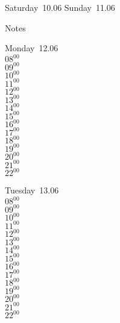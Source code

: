 \documentclass[11pt,a4paper]{book}\usepackage[]{graphicx}\usepackage[]{color}
\begin{document}
\begin{weekendbox}
  Saturday~10.06
  \tcblower
  Sunday~11.06
\end{weekendbox} %
\begin{notebox}
  Notes
\end{notebox}
\clearpage
\begin{headerbox}
\end{headerbox}
\begin{weekdaybox}
  Monday~12.06\\
  { 
  \vfill
  $08^{00}$\\
$09^{00}$\\
$10^{00}$\\
$11^{00}$\\
$12^{00}$\\
$13^{00}$\\
$14^{00}$\\
$15^{00}$\\
$16^{00}$\\
$17^{00}$\\
$18^{00}$\\
$19^{00}$\\
$20^{00}$\\
$21^{00}$\\
$22^{00}$\\
  }
\end{weekdaybox}
\begin{weekdaybox}
  Tuesday~13.06\\
  { 
  \vfill
  $08^{00}$\\
$09^{00}$\\
$10^{00}$\\
$11^{00}$\\
$12^{00}$\\
$13^{00}$\\
$14^{00}$\\
$15^{00}$\\
$16^{00}$\\
$17^{00}$\\
$18^{00}$\\
$19^{00}$\\
$20^{00}$\\
$21^{00}$\\
$22^{00}$\\
  }
\end{weekdaybox}
\end{document}
